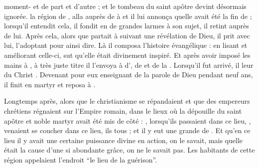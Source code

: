  moment-   et  de part et d'autre ; %
et le tombeau du saint apôtre  devint désormais ignorée.
 la région de ,  alla auprès de  à 
et il lui annonça quelle avait été la fin de  ;
lorsqu'il entendit cela, il fondit en de grandes larmes à son sujet, il retint  auprès de lui.
Après cela, alors que  partait à  suivant une révélation de Dieu, il prit  avec lui, l'adoptant pour ainsi dire.
Là il composa l'histoire évangélique :
en lisant et améliorant celle-ci,  sut qu'elle était divinement inspiré. 
Et après avoir imposé les mains à , à très juste titre il l'envoya 
 à  d', de  et de la . %
Lorsqu'il fut arrivé, il leur  du Christ .
Devenant  pour eux enseignant de la parole de Dieu pendant neuf ans, il finit en martyr et reposa à .

\saut

Longtemps après, alors que le christianisme se répandaient et que des empereurs chrétiens régnaient sur l'Empire romain,  dans le lieux où la dépouille du saint apôtre et noble martyr  avait été mis de côté :
, lorsqu'ils passaient dans ce lieu, ,  venaient se coucher dans ce lieu, ils  tous ; et il y eut une grande  de .
Et qu'en ce lieu il y avait une certaine puissance divine en action, on le savait, 
mais quelle était la cause d'une si abondante grâce, on ne le savait pas.
Les habitants de cette région appelaient l'endroit \enquote{le lieu de la guérison}.

